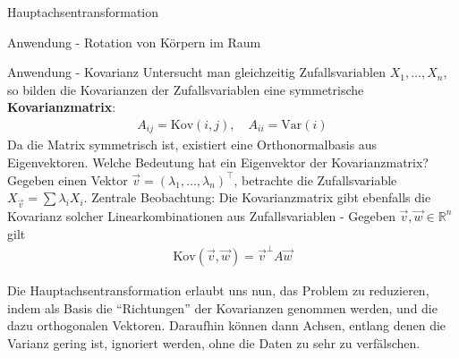 \documentclass{report}
\newcommand{\tbf}[1]{\textbf{#1}}
\newcommand{\bR}{\mathbb{R}}
\newcommand{\vv}{\vec{v}}
\newcommand{\vw}{\vec{w}}
\begin{document}
\begin{section}{Hauptachsentransformation}
\begin{subsection}{Anwendung - Rotation von Körpern im Raum}
 \end{subsection}
 \begin{subsection}{Anwendung - Kovarianz}
  Untersucht man gleichzeitig Zufallsvariablen $X_1, \hdots, X_n$, so bilden die Kovarianzen der Zufallsvariablen eine symmetrische \tbf{Kovarianzmatrix}:
  \begin{align*}
   A_{ij} = \text{Kov}(i,j), \quad A_{ii} = \text{Var}(i)
  \end{align*}
Da die Matrix symmetrisch ist, existiert eine Orthonormalbasis aus Eigenvektoren. Welche Bedeutung hat ein Eigenvektor der Kovarianzmatrix? Gegeben einen Vektor $\vv = (\lambda_1, \hdots, \lambda_n)^\top$, betrachte die Zufallsvariable $X_{\vv} = \sum \lambda_i X_i$. Zentrale Beobachtung: Die Kovarianzmatrix gibt ebenfalls die Kovarianz solcher Linearkombinationen aus Zufallsvariablen - Gegeben $\vv, \vw \in \bR^n$ gilt 
  \begin{align*}
   \text{Kov}(\vv, \vw) = \vv^\bot A \vw
  \end{align*}
 \end{subsection}
 Die Hauptachsentransformation erlaubt uns nun, das Problem zu reduzieren, indem als Basis die ``Richtungen'' der Kovarianzen genommen werden, und die dazu orthogonalen Vektoren. Daraufhin können dann Achsen, entlang denen die Varianz gering ist, ignoriert werden, ohne die Daten zu sehr zu verfälschen.
\end{section}


%
%
%
%
%
%
%
%
%
%
%
%
%
%
%
%
%
%
%
%
%
%
%
%
%
%
%
%
%
%
%
%
%
%
%
%
%
%
%
%
%
%
%
%
%
%
%
\appendix
\end{document}
